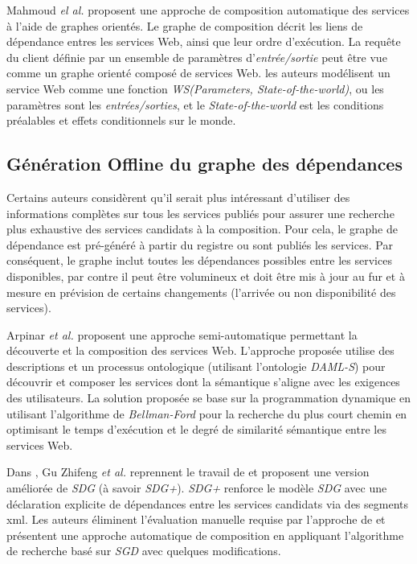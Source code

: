   Mahmoud \emph{el al.} \cite{mahmoud2013towards} proposent une
  approche de composition automatique des services à l'aide de graphes
  orientés. Le graphe de composition décrit les liens de dépendance
  entres les services Web, ainsi que leur ordre d'exécution. La requête
  du client définie par un ensemble de paramètres
  d'\textit{entrée/sortie} peut être vue comme un graphe orienté
  composé de services Web. les auteurs modélisent un service Web comme
  une fonction \textit{WS(Parameters, State-of-the-world)}, ou les
  paramètres sont les \textit{entrées/sorties}, et le
  \textit{State-of-the-world} est les conditions préalables et effets
  conditionnels sur le monde.

  \subsection{Génération Offline du graphe des dépendances}
  \label{sec:generation-offline}
  Certains auteurs considèrent qu'il serait plus intéressant
  d'utiliser des informations complètes sur tous les services publiés
  pour assurer une recherche plus exhaustive des services candidats à
  la composition. Pour cela, le graphe de dépendance est pré-généré à
  partir du registre ou sont publiés les services. Par conséquent, le
  graphe inclut toutes les dépendances possibles entre les services
  disponibles, par contre il peut être volumineux et doit être mis à
  jour au fur et à mesure en prévision de certains changements (l'arrivée ou non
  disponibilité des services).\bigskip

  Arpinar \textit{et al.} \cite{arpinar2005ontology} proposent une
  approche semi-automatique permettant la découverte et la composition
  des services Web. L'approche proposée utilise des descriptions et un
  processus ontologique (utilisant l'ontologie \textit{DAML-S}) pour
  découvrir et composer les services dont la sémantique s'aligne avec
  les exigences des utilisateurs. La solution proposée se base sur la
  programmation dynamique en utilisant l'algorithme de
  \textit{Bellman-Ford} pour la recherche du plus court chemin en
  optimisant le temps d'exécution et le degré de similarité sémantique
  entre les services Web.\bigskip

  Dans \cite{gu2008automatic}, Gu Zhifeng \textit{et al.} reprennent
  le travail de \cite{liang2005and} et proposent une version améliorée
  de \textit{SDG} (à savoir \textit{SDG+}). \textit{SDG+} renforce le
  modèle \textit{SDG} avec une déclaration explicite de dépendances
  entre les services candidats via des segments \acrshort{xml}. Les
  auteurs éliminent l'évaluation manuelle requise par l'approche de
  \cite{liang2005and} et présentent une approche automatique de
  composition en appliquant l'algorithme de recherche basé sur
  \textit{SGD} avec quelques modifications.\bigskip

